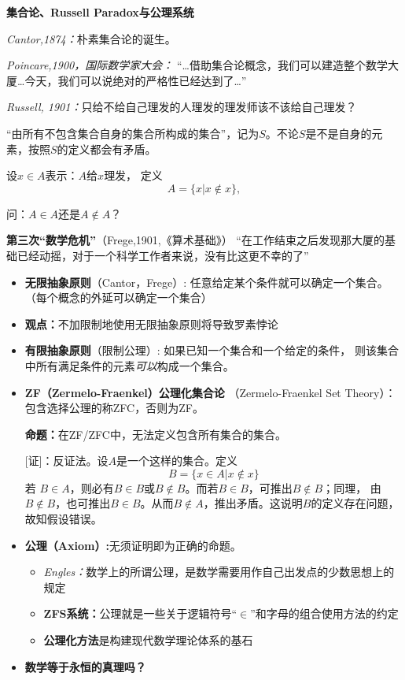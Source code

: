 \begin{shaded}

{\bf 集合论、Russell Paradox与公理系统}

	{\it Cantor,1874：}朴素集合论的诞生。	

	{\it Poincare,1900，国际数学家大会：} 
		 {“\ldots 借助集合论概念，我们可以建造整个数学大厦\ldots  今天，我们可以说绝对的严格性已经达到了\ldots”}
	
	{\it Russell, 1901：}只给不给自己理发的人理发的理发师该不该给自己理发？
	
	“由所有不包含集合自身的集合所构成的集合”，记为$S$。不论$S$是不是自身的元素，按照$S$的定义都会有矛盾。
	
	设$x\in A$表示：$A$给$x$理发， 定义
	$$A=\{x|x\notin x\},$$ 
	
	问：$A\in A$还是$A\notin A$？ 
	
	{{\bf {第三次“数学危机”}}（Frege,1901,《算术基础》）}
		“在工作结束之后发现那大厦的基础已经动摇，对于一个科学工作者来说，没有比这更不幸的了”
		
	\begin{itemize}
	  \item {{\bf 无限抽象原则}（Cantor，Frege）:} 任意给定某个条件就可以确定一个集合。（每个概念的外延可以确定一个集合）
	  \item {\bf 观点：}不加限制地使用无限抽象原则将导致罗素悖论
	  \item {{\bf 有限抽象原则}（限制公理）:} 如果已知一个集合和一个给定的条件，
	  则该集合中所有满足条件的元素{\it 可以}构成一个集合。
	  \item {\bf ZF（Zermelo-Fraenkel）公理化集合论}
	  （Zermelo-Fraenkel Set Theory）：包含选择公理的称ZFC，否则为ZF。
	  
	  {\bf 命题：}在ZF/ZFC中，无法定义包含所有集合的集合。
	
	[证]：反证法。设$A$是一个这样的集合。定义
	$$B=\{x\in A|x\notin x\}$$
	若
	$B\in A$，则必有$B\in B$或$B\notin B$。而若$B\in B$，可推出$B\notin B$；同理，
	由$B\notin B$，也可推出$B\in B$。从而$B\notin A$，推出矛盾。这说明$B$的定义存在问题，故知假设错误。

	\item {\bf 公理（Axiom）:}无须证明即为正确的命题。
	\begin{itemize}
	  \item {\it Engles：}数学上的所谓公理，是数学需要用作自己出发点的少数思想上的规定 
	  \item {\bf ZFS系统：}公理就是一些关于逻辑符号{“$\in$”}和{字母}的组合使用方法的约定
	  \item {\bf 公理化方法}是构建现代数学理论体系的基石
	\end{itemize}
	\item {\bf {数学等于永恒的真理吗？}}
	\end{itemize}
	

\end{shaded}
